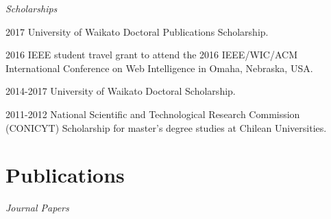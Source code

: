 \documentclass[letterpaper]{article}
\begin{document}
\begin{flushleft}
\emph{Scholarships}
\end{flushleft}

\begin{CV}

\item[2017] University of Waikato Doctoral Publications Scholarship.

\item[2016] IEEE student travel grant to attend the 2016
IEEE/WIC/ACM International Conference on Web Intelligence in Omaha, Nebraska, USA.

\item[2014-2017]  University of Waikato Doctoral Scholarship.

\item[2011-2012]  National Scientific and Technological Research Commission (CONICYT) Scholarship for master's degree studies at Chilean Universities.



\end{CV}



\section{Publications}

\begin{flushleft}
\emph{Journal Papers}
\end{flushleft}
\end{document}
